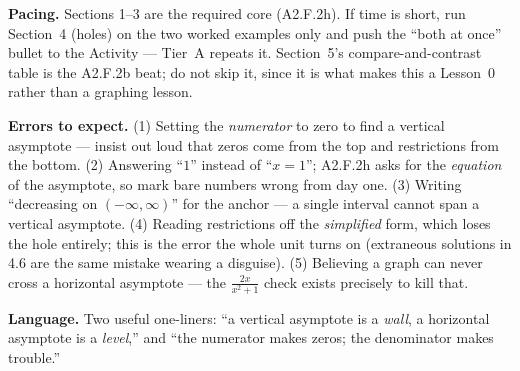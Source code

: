 \documentclass[10pt]{article}
\begin{document}
\begin{teachernote}
\textbf{Pacing.} Sections 1--3 are the required core (A2.F.2h). If time is short, run Section~4
(holes) on the two worked examples only and push the ``both at once'' bullet to the Activity ---
Tier~A repeats it. Section~5's compare-and-contrast table is the A2.F.2b beat; do not skip it, since it
is what makes this a Lesson~0 rather than a graphing lesson.

\textbf{Errors to expect.} (1) Setting the \emph{numerator} to zero to find a vertical asymptote ---
insist out loud that zeros come from the top and restrictions from the bottom. (2) Answering ``$1$''
instead of ``$x=1$''; A2.F.2h asks for the \emph{equation} of the asymptote, so mark bare numbers
wrong from day one. (3) Writing ``decreasing on $(-\infty,\infty)$'' for the anchor --- a single
interval cannot span a vertical asymptote. (4) Reading restrictions off the \emph{simplified} form,
which loses the hole entirely; this is the error the whole unit turns on (extraneous solutions in 4.6
are the same mistake wearing a disguise). (5) Believing a graph can never cross a horizontal
asymptote --- the $\frac{2x}{x^2+1}$ check exists precisely to kill that.

\textbf{Language.} Two useful one-liners: ``a vertical asymptote is a \emph{wall}, a horizontal
asymptote is a \emph{level},'' and ``the numerator makes zeros; the denominator makes trouble.''
\end{teachernote}
\end{document}
